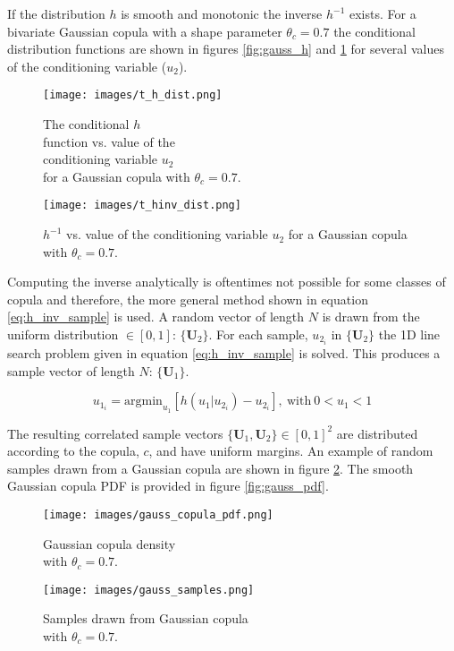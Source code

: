 If the distribution $h$ is smooth and monotonic the inverse $h^{-1}$ exists.  For a bivariate Gaussian copula with a shape parameter $\theta_c=0.7$ the conditional distribution functions are shown in figures \ref{fig:gauss_h} and \ref{fig:gauss_hinv} for several values of the conditioning variable ($u_2$).  

\begin{figure}[!htbp]
	\centering
	\begin{minipage}{.45\textwidth}
		\texttt{[image: images/t\_h\_dist.png]}
		\caption{The conditional $h$ \\ function vs. value of the \\ conditioning variable $u_2$ \\ for a Gaussian copula with $\theta_c=0.7$.}
		\label{fig:gauss_h}
	\end{minipage}%
	\begin{minipage}{.45\textwidth}
		\texttt{[image: images/t\_hinv\_dist.png]}
		\caption{$h^{-1}$ vs. value of the conditioning variable $u_2$ for a Gaussian copula with $\theta_c=0.7$.\\}
		\label{fig:gauss_hinv}
	\end{minipage}
\end{figure}

Computing the inverse analytically is oftentimes not possible for some classes of copula and therefore, the more general method shown in equation \ref{eq:h_inv_sample} is used.
A random vector of length $N$ is drawn from the uniform distribution $\in [0, 1]$:  $\{\mathbf U_2\}$.  For each sample, $u_{2_i}$ in $\{\mathbf U_2\}$ the 1D line search problem given in equation \ref{eq:h_inv_sample} is solved.  This produces a sample vector of length $N$: $\{\mathbf U_1\}$.

\begin{equation}
u_{1_i} = \mathrm{argmin}_{u_1} \left[ h(u_1|u_{2_i}) - u_{2_i} \right],\ \mathrm{with}\ 0 < u_1 < 1
\label{eq:h_inv_sample}
\end{equation}

The resulting correlated sample vectors $\{\mathbf U_1, \mathbf U_2\} \in [0,1]^2$ are distributed according to the copula, $c$, and have uniform margins.  An example of random samples drawn from a Gaussian copula are shown in figure \ref{fig:gauss_samples}.  The smooth Gaussian copula PDF is provided in figure \ref{fig:gauss_pdf}.

\begin{figure}[!htbp]
	\centering
	\begin{minipage}{.45\textwidth}
		\texttt{[image: images/gauss\_copula\_pdf.png]}
		\caption{Gaussian copula density\\ with $\theta_c=0.7$.}
		\label{fig:gauss_pdf}
	\end{minipage}%
	\begin{minipage}{.45\textwidth}
		\texttt{[image: images/gauss\_samples.png]}
		\caption{Samples drawn from Gaussian copula\\ with $\theta_c=0.7$.}
		\label{fig:gauss_samples}
	\end{minipage}
\end{figure}

